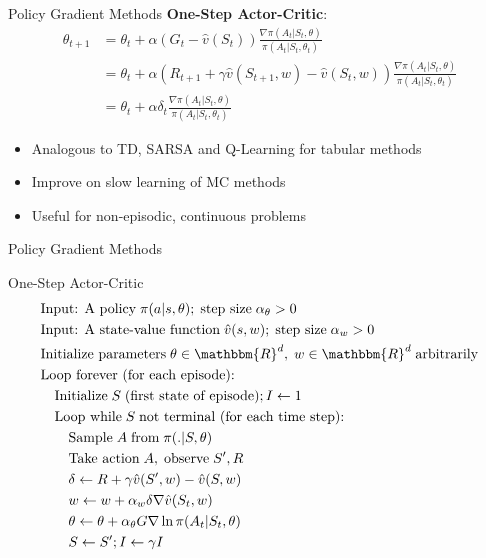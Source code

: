\documentclass[ignorenonframetext,xcolor=x11names]{beamer}
\begin{document}
\begin{frame}{Policy Gradient Methods}
\textbf{One-Step Actor-Critic}:
\begin{align*}
\theta_{t+1} &= \theta_t + \alpha (G_{t} - \hat{v}(S_t)) \frac{\nabla \pi(A_t | S_t, \theta)}{\pi(A_t | S_t, \theta_t)} \\
&= \theta_t + \alpha (R_{t+1} + \gamma \hat{v}(S_{t+1}, w) - \hat{v}(S_t, w)) \frac{\nabla \pi(A_t | S_t, \theta)}{\pi(A_t | S_t, \theta_t)} \\
&= \theta_t + \alpha \delta_t \frac{\nabla \pi(A_t | S_t, \theta)}{\pi(A_t | S_t, \theta_t)}
\end{align*}
\begin{itemize}
  \item Analogous to TD, SARSA and Q-Learning for tabular methods
  \item Improve on slow learning of MC methods
  \item Useful for non-episodic, continuous problems
\end{itemize}
\end{frame}

\begin{frame}{Policy Gradient Methods}
\small
\begin{block}{One-Step Actor-Critic}
\vspace{-.5\baselineskip}
\begin{align*}
& \text{Input: A policy}\;\pi(a | s, \theta);\;\text{step size}\; \alpha_\theta > 0 \\
& \text{Input: A state-value function}\;\hat{v}(s, w);\;\text{step size}\; \alpha_w > 0 \\
& \text{Initialize parameters}\; \theta \in \mathbbm{R}^d,\; w \in \mathbbm{R}^d\;\text{arbitrarily} \\
& \text{Loop forever (for each episode):} \\
& \quad \text{Initialize}\;S\;\text{(first state of episode)}; I \leftarrow 1 \\
& \quad \text{Loop while}\;S\;\text{not terminal (for each time step):} \\
& \quad \quad \text{Sample}\;A\;\text{from}\; \pi(.|S, \theta) \\
& \quad \quad \text{Take action}\;A,\;\text{observe}\;S', R \\
& \quad \quad \delta \leftarrow R + \gamma \hat{v}(S', w) - \hat{v}(S, w) \\
& \quad \quad w \leftarrow w + \alpha_w \delta \nabla \hat{v}(S_t, w) \\
& \quad \quad \theta \leftarrow \theta + \alpha_\theta G \nabla \ln \pi(A_t | S_t, \theta) \\
& \quad \quad S \leftarrow S'; I \leftarrow \gamma I
\end{align*}
\vspace{-\baselineskip}
\end{block}
\end{frame}
\end{document}
